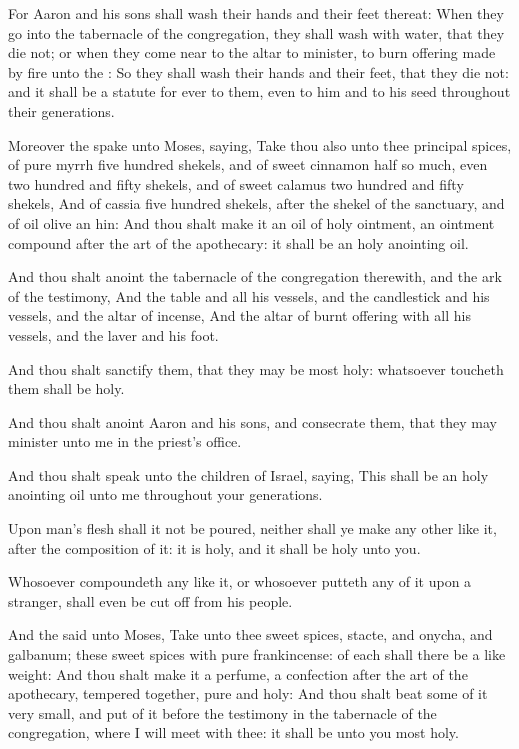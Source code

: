 \verse For Aaron and his sons shall wash their hands and their feet
thereat: \verse When they go into the tabernacle of the congregation,
they shall wash with water, that they die not; or when they come near
to the altar to minister, to burn offering made by fire unto the \LORD:
\verse So they shall wash their hands and their feet, that they die
not: and it shall be a statute for ever to them, even to him and to
his seed throughout their generations.

\verse Moreover the \LORD spake unto Moses, saying, \verse Take thou also
unto thee principal spices, of pure myrrh five hundred shekels, and of
sweet cinnamon half so much, even two hundred and fifty shekels, and
of sweet calamus two hundred and fifty shekels, \verse And of cassia
five hundred shekels, after the shekel of the sanctuary, and of oil
olive an hin: \verse And thou shalt make it an oil of holy ointment, an
ointment compound after the art of the apothecary: it shall be an holy
anointing oil.

\verse And thou shalt anoint the tabernacle of the congregation
therewith, and the ark of the testimony, \verse And the table and all
his vessels, and the candlestick and his vessels, and the altar of
incense, \verse And the altar of burnt offering with all his vessels,
and the laver and his foot.

\verse And thou shalt sanctify them, that they may be most holy:
whatsoever toucheth them shall be holy.

\verse And thou shalt anoint Aaron and his sons, and consecrate them,
that they may minister unto me in the priest's office.

\verse And thou shalt speak unto the children of Israel, saying, This
shall be an holy anointing oil unto me throughout your generations.

\verse Upon man's flesh shall it not be poured, neither shall ye make
any other like it, after the composition of it: it is holy, and it
shall be holy unto you.

\verse Whosoever compoundeth any like it, or whosoever putteth any of
it upon a stranger, shall even be cut off from his people.

\verse And the \LORD said unto Moses, Take unto thee sweet spices,
stacte, and onycha, and galbanum; these sweet spices with pure
frankincense: of each shall there be a like weight: \verse And thou
shalt make it a perfume, a confection after the art of the apothecary,
tempered together, pure and holy: \verse And thou shalt beat some of it
very small, and put of it before the testimony in the tabernacle of
the congregation, where I will meet with thee: it shall be unto you
most holy.

